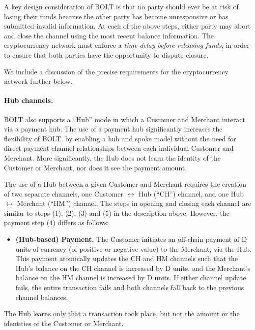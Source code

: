 \documentclass[11pt]{report}
\begin{document}
A key design consideration of BOLT is that no party should ever be at risk of losing their funds because the other party has become unresponsive or has submitted invalid information. At each of the above steps, either party may abort and close the channel using the most recent balance information. The cryptocurrency network must enforce a {\em time-delay before releasing funds}, in order to ensure that both parties have the opportunity to dispute closure. 

We include a discussion of the precise requirements for the cryptocurrency network further below.

\paragraph{Hub channels.} BOLT also supports a ``Hub'' mode in which a Customer and Merchant interact via a payment hub. The use of a payment hub significantly increases the flexibility of BOLT, by enabling a hub and spoke model without the need for direct payment channel relationships between each individual Customer and Merchant. More significantly, the Hub does not learn the identity of the Customer or Merchant, nor does it see the payment amount.

The use of a Hub between a given Customer and Merchant requires the creation of two separate channels, one Customer $\longleftrightarrow$ Hub (``CH'') channel, and one Hub $\longleftrightarrow$ Merchant (``HM'') channel. The steps in opening and closing each channel are similar to steps (1), (2), (3) and (5) in the description above. However, the payment step (4) differs as follows:

\begin{itemize}
\item {\bf (Hub-based) Payment.} The Customer initiates an off-chain payment of D units of currency (of positive or negative value) to the Merchant, via the Hub. This payment atomically updates the CH and HM channels such that the Hub's balance on the CH channel is increased by D units, and the Merchant's balance on the HM channel is increased by D units. If either channel update fails, the entire transaction fails and both channels fall back to the previous channel balances.
\end{itemize}

The Hub learns only that a transaction took place, but not the amount or the identities of the Customer or Merchant.


{\normalsize

}
\rhead{}
\end{document}
